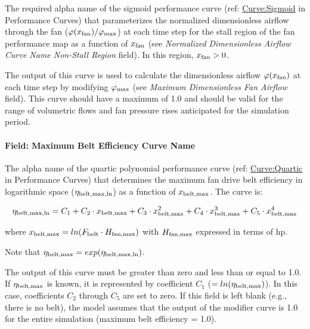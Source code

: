 The required alpha name of the sigmoid performance curve (ref: \hyperref[curvesigmoid]{Curve:Sigmoid} in Performance Curves) that parameterizes the normalized dimensionless airflow through the fan (\(\varphi (x_{\rm{fan}}) / \varphi_{\rm{max}}\)) at each time step for the stall region of the fan performance map as a function of \(x_{\rm{fan}}\) (see \emph{Normalized Dimensionless Airflow Curve Name Non-Stall Region} field). In this region, \(x_{\rm{fan}} > 0\).

The output of this curve is used to calculate the dimensionless airflow \(\varphi (x_{\rm{fan}})\) at each time step by modifying \(\varphi_{\rm{max}}\) (see \emph{Maximum Dimensionless Fan Airflow} field). This curve should have a maximum of 1.0 and should be valid for the range of volumetric flows and fan pressure rises anticipated for the simulation period.

\paragraph{Field: Maximum Belt Efficiency Curve Name}\label{field-maximum-belt-efficiency-curve-name}

The alpha name of the quartic polynomial performance curve (ref: \hyperref[curvequartic]{Curve:Quartic} in Performance Curves) that determines the maximum fan drive belt efficiency in logarithmic space (\(\eta_{\rm{belt, max, ln}}\)) as a function of \(x_{\rm{belt, max}}\). The curve is:

\begin{equation}
\eta_{\rm{belt, max, ln}} = C_1 + C_2 \cdot x_{\rm{belt, max}} + C_3 \cdot x_{\rm{belt, max}}^2 + C_4 \cdot x_{\rm{belt, max}}^3 + C_5 \cdot x_{\rm{belt, max}}^4
\end{equation}

where \(x_{\rm{belt, max}} = ln(F_{\rm{belt}} \cdot H_{\rm{fan, max}})\) with \(H_{\rm{fan, max}}\) expressed in terms of hp.

Note that \(\eta_{\rm{belt, max}} = exp(\eta_{\rm{belt, max, ln}})\).

The output of this curve must be greater than zero and less than or equal to 1.0. If \(\eta_{\rm{belt, max}}\) is known, it is represented by coefficient \(C_1\) (\(= ln(\eta_{\rm{belt, max}})\)). In this case, coefficients \(C_2\) through \(C_5\) are set to zero. If this field is left blank (e.g., there is no belt), the model assumes that the output of the modifier curve is 1.0 for the entire simulation (maximum belt efficiency = 1.0).

